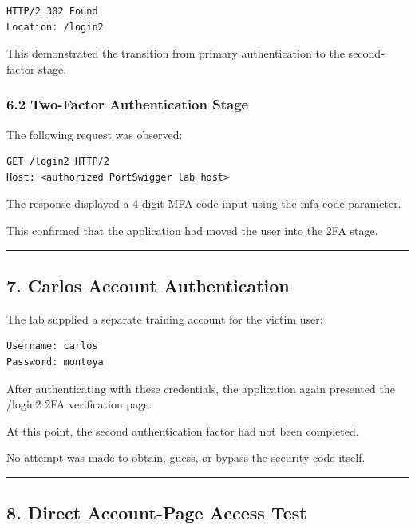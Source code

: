 \documentclass[
]{article}
\begin{document}
\begin{verbatim}
HTTP/2 302 Found
Location: /login2
\end{verbatim}

This demonstrated the transition from primary authentication to the
second-factor stage.

\subsubsection{6.2 Two-Factor Authentication
Stage}\label{two-factor-authentication-stage}

The following request was observed:

\begin{verbatim}
GET /login2 HTTP/2
Host: <authorized PortSwigger lab host>
\end{verbatim}

The response displayed a 4-digit MFA code input using the mfa-code
parameter.

This confirmed that the application had moved the user into the 2FA
stage.

\begin{center}\rule{0.5\linewidth}{0.5pt}\end{center}

\subsection{7. Carlos Account
Authentication}\label{carlos-account-authentication}

The lab supplied a separate training account for the victim user:

\begin{verbatim}
Username: carlos
Password: montoya
\end{verbatim}

After authenticating with these credentials, the application again
presented the /login2 2FA verification page.

At this point, the second authentication factor had not been completed.

No attempt was made to obtain, guess, or bypass the security code
itself.

\begin{center}\rule{0.5\linewidth}{0.5pt}\end{center}

\subsection{8. Direct Account-Page Access
Test}\label{direct-account-page-access-test}
\end{document}
